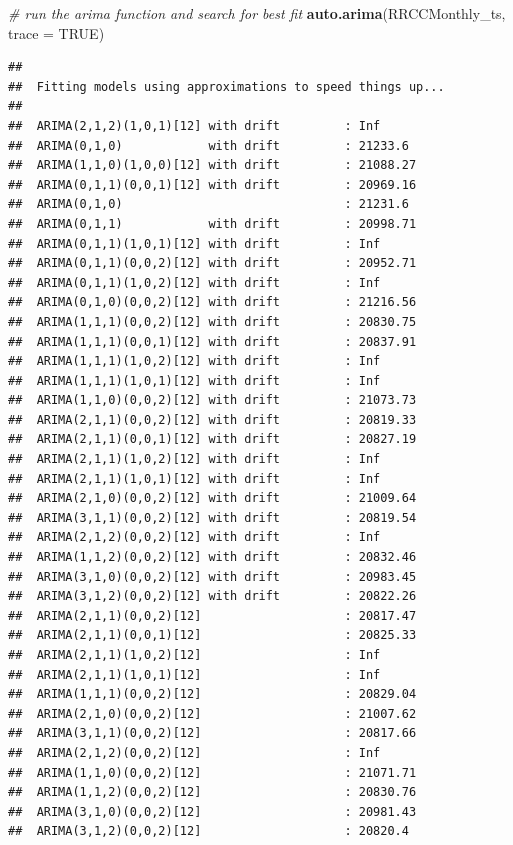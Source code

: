 \documentclass[12pt,]{article}
\newenvironment{Shaded}{\begin{snugshade}}{\end{snugshade}}
\newcommand{\CommentTok}[1]{\textcolor[rgb]{0.56,0.35,0.01}{\textit{#1}}}
\newcommand{\DataTypeTok}[1]{\textcolor[rgb]{0.13,0.29,0.53}{#1}}
\newcommand{\KeywordTok}[1]{\textcolor[rgb]{0.13,0.29,0.53}{\textbf{#1}}}
\newcommand{\NormalTok}[1]{#1}
\newcommand{\OtherTok}[1]{\textcolor[rgb]{0.56,0.35,0.01}{#1}}
\begin{document}
\begin{Shaded}
\begin{Highlighting}[]
\CommentTok{# run the arima function and search for best fit}
\KeywordTok{auto.arima}\NormalTok{(RRCCMonthly_ts, }\DataTypeTok{trace =} \OtherTok{TRUE}\NormalTok{)}
\end{Highlighting}
\end{Shaded}

\begin{verbatim}
## 
##  Fitting models using approximations to speed things up...
## 
##  ARIMA(2,1,2)(1,0,1)[12] with drift         : Inf
##  ARIMA(0,1,0)            with drift         : 21233.6
##  ARIMA(1,1,0)(1,0,0)[12] with drift         : 21088.27
##  ARIMA(0,1,1)(0,0,1)[12] with drift         : 20969.16
##  ARIMA(0,1,0)                               : 21231.6
##  ARIMA(0,1,1)            with drift         : 20998.71
##  ARIMA(0,1,1)(1,0,1)[12] with drift         : Inf
##  ARIMA(0,1,1)(0,0,2)[12] with drift         : 20952.71
##  ARIMA(0,1,1)(1,0,2)[12] with drift         : Inf
##  ARIMA(0,1,0)(0,0,2)[12] with drift         : 21216.56
##  ARIMA(1,1,1)(0,0,2)[12] with drift         : 20830.75
##  ARIMA(1,1,1)(0,0,1)[12] with drift         : 20837.91
##  ARIMA(1,1,1)(1,0,2)[12] with drift         : Inf
##  ARIMA(1,1,1)(1,0,1)[12] with drift         : Inf
##  ARIMA(1,1,0)(0,0,2)[12] with drift         : 21073.73
##  ARIMA(2,1,1)(0,0,2)[12] with drift         : 20819.33
##  ARIMA(2,1,1)(0,0,1)[12] with drift         : 20827.19
##  ARIMA(2,1,1)(1,0,2)[12] with drift         : Inf
##  ARIMA(2,1,1)(1,0,1)[12] with drift         : Inf
##  ARIMA(2,1,0)(0,0,2)[12] with drift         : 21009.64
##  ARIMA(3,1,1)(0,0,2)[12] with drift         : 20819.54
##  ARIMA(2,1,2)(0,0,2)[12] with drift         : Inf
##  ARIMA(1,1,2)(0,0,2)[12] with drift         : 20832.46
##  ARIMA(3,1,0)(0,0,2)[12] with drift         : 20983.45
##  ARIMA(3,1,2)(0,0,2)[12] with drift         : 20822.26
##  ARIMA(2,1,1)(0,0,2)[12]                    : 20817.47
##  ARIMA(2,1,1)(0,0,1)[12]                    : 20825.33
##  ARIMA(2,1,1)(1,0,2)[12]                    : Inf
##  ARIMA(2,1,1)(1,0,1)[12]                    : Inf
##  ARIMA(1,1,1)(0,0,2)[12]                    : 20829.04
##  ARIMA(2,1,0)(0,0,2)[12]                    : 21007.62
##  ARIMA(3,1,1)(0,0,2)[12]                    : 20817.66
##  ARIMA(2,1,2)(0,0,2)[12]                    : Inf
##  ARIMA(1,1,0)(0,0,2)[12]                    : 21071.71
##  ARIMA(1,1,2)(0,0,2)[12]                    : 20830.76
##  ARIMA(3,1,0)(0,0,2)[12]                    : 20981.43
##  ARIMA(3,1,2)(0,0,2)[12]                    : 20820.4

\end{verbatim}
\end{document}
